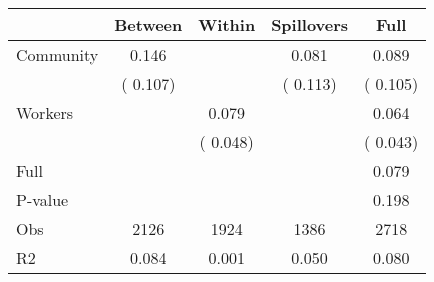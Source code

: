 
\begin{tabular}{l*{4}{c}}\hline&\multicolumn{1}{c}{Between}&\multicolumn{1}{c}{Within}&\multicolumn{1}{c}{Spillovers}&\multicolumn{1}{c}{Full}\\ \hline
 Community             &              0.146      &                                               &        0.081 &         0.089                            \\ 
                               &        (       0.107)           &                                       &       (       0.113)     &      (       0.105)                                           \\ 
 Workers       &                                               &        0.079    &                                &             0.064                            \\ 
                               &                                               & (       0.048)                  &                                        &      (       0.043)                                           \\ 
\hline                                                                                                                                                                                                                                            
 Full                  &                                               &                                               &                                        &             0.079                                     \\ 
 P-value               &                                               &                                               &                                        &             0.198                                           \\ 
 Obs                   &               2126               &       1924                       &       1386                &              2718                                               \\ 
 R2                    &                      0.084              &              0.001                      &              0.050               &                     0.080                                              \\ 
\hline \end{tabular}                                                                                                                                                                                                              